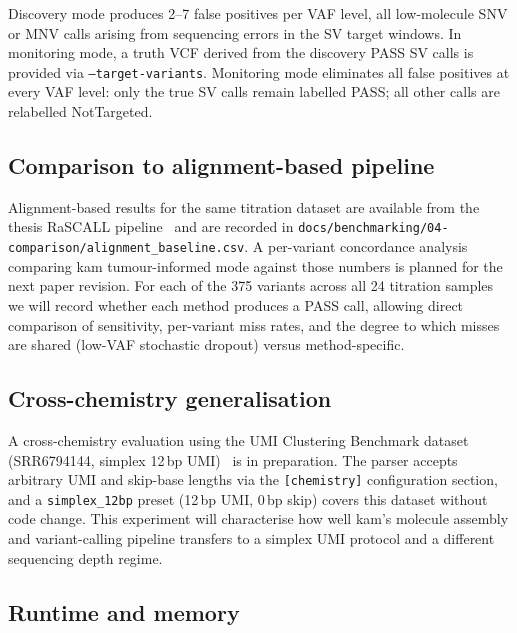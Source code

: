Discovery mode produces 2--7 false positives per VAF level, all low-molecule SNV or MNV calls arising from sequencing errors in the SV target windows. In monitoring mode, a truth VCF derived from the discovery PASS SV calls is provided via \texttt{--target-variants}. Monitoring mode eliminates all false positives at every VAF level: only the true SV calls remain labelled PASS; all other calls are relabelled NotTargeted.

\subsection{Comparison to alignment-based pipeline}
\label{sec:results-comparison}

Alignment-based results for the same titration dataset are available from the
thesis RaSCALL pipeline~\autocite{ZengThesis} and are recorded in
\texttt{docs/benchmarking/04-comparison/alignment\_baseline.csv}.
A per-variant concordance analysis comparing kam tumour-informed mode against
those numbers is planned for the next paper revision.
For each of the 375 variants across all 24 titration samples we will record
whether each method produces a PASS call, allowing direct comparison of
sensitivity, per-variant miss rates, and the degree to which misses are shared
(low-VAF stochastic dropout) versus method-specific.

\subsection{Cross-chemistry generalisation}
\label{sec:results-crosschem}

A cross-chemistry evaluation using the UMI Clustering Benchmark dataset
(SRR6794144, simplex 12\,bp UMI)~\autocite{Calib25umi} is in preparation.
The parser accepts arbitrary UMI and skip-base lengths via the
\texttt{[chemistry]} configuration section, and a \texttt{simplex\_12bp}
preset (12\,bp UMI, 0\,bp skip) covers this dataset without code change.
This experiment will characterise how well kam's molecule assembly and
variant-calling pipeline transfers to a simplex UMI protocol and a different
sequencing depth regime.

\subsection{Runtime and memory}

